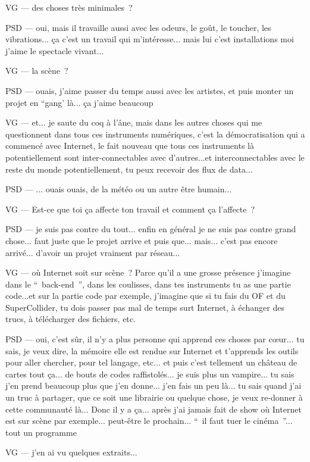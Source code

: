 VG — des choses très minimales ?

PSD — oui, mais il travaille aussi avec les odeurs, le goût, le toucher, les vibrations... ça c'est un travail qui m'intéresse... mais lui c'est installations moi j'aime le spectacle vivant...

VG — la scène ?

PSD — ouais, j'aime passer du temps aussi avec les artistes, et puis monter un projet en “gang' là... ça j'aime beaucoup

VG — et... je saute du coq à l'âne, mais dans les autres choses qui me questionnent dans tous ces instruments numériques, c'est la démocratisation qui a commencé avec Internet, le fait nouveau que tous ces instruments là potentiellement sont inter-connectables avec d'autres...et interconnectables avec le reste du monde potentiellement, tu peux recevoir des flux de data...

PSD — ... ouais ouais, de la météo ou un autre être humain...

VG — Est-ce que toi ça affecte ton travail et comment ça l'affecte ?

PSD — je suis pas contre du tout... enfin en général je ne suis pas contre grand chose... faut juste que le projet arrive et puis que... mais... c'est pas encore arrivé... d'avoir un projet vraiment par réseau...

VG — où Internet soit sur scène ? Parce qu'il a une grosse présence j'imagine dans le “ back-end ”, dans les coulisses, dans tes instruments tu as une partie code...et sur la partie code par exemple, j'imagine que si tu fais du OF et du SuperCollider, tu dois passer pas mal de temps surt Internet, à échanger des trucs, à  télécharger des fichiers, etc.

PSD — oui, c'est sûr, il n'y a plus personne qui apprend ces choses par cœur... tu sais, je veux dire,  la mémoire elle est rendue sur Internet et t'apprends les outils pour aller chercher, pour tel langage, etc... et puis c'est tellement un château de cartes tout ça... de bouts de codes raffistolés... je suis plus un vampire... tu sais j'en prend beaucoup plus que j'en donne... j'en fais un peu là... tu sais quand j'ai un truc à partager, que ce soit une librairie ou quelque chose, je veux re-donner à cette communauté là... Donc il y a ça... après j'ai jamais fait de show où Internet est sur scène par exemple... peut-être le prochain... “ il faut tuer le cinéma ”... tout un programme 

VG — j'en ai vu quelques extraits...

